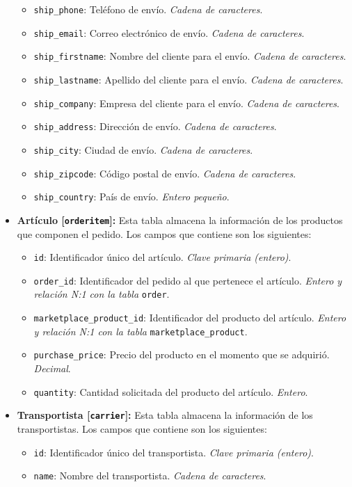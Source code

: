 \begin{itemize}
\begin{itemize}
              \item \texttt{ship\_phone}: Teléfono de envío. \textit{Cadena de caracteres}.
              \item \texttt{ship\_email}: Correo electrónico de envío. \textit{Cadena de caracteres}.
              \item \texttt{ship\_firstname}: Nombre del cliente para el envío. \textit{Cadena de caracteres}.
              \item \texttt{ship\_lastname}: Apellido del cliente para el envío. \textit{Cadena de caracteres}.
              \item \texttt{ship\_company}: Empresa del cliente para el envío. \textit{Cadena de caracteres}.
              \item \texttt{ship\_address}: Dirección de envío. \textit{Cadena de caracteres}.
              \item \texttt{ship\_city}: Ciudad de envío. \textit{Cadena de caracteres}.
              \item \texttt{ship\_zipcode}: Código postal de envío. \textit{Cadena de caracteres}.
              \item \texttt{ship\_country}: País de envío. \textit{Entero pequeño}.
          \end{itemize}
    \item \textbf{Artículo [\texttt{orderitem}]:} Esta tabla almacena la información de los productos que componen el pedido. Los campos que contiene son los siguientes:
          \begin{itemize}
              \item \texttt{id}: Identificador único del artículo. \textit{Clave primaria (entero)}.
              \item \texttt{order\_id}: Identificador del pedido al que pertenece el artículo. \textit{Entero y relación N:1 con la tabla} \texttt{order}.
              \item \texttt{marketplace\_product\_id}: Identificador del producto del artículo. \textit{Entero y relación N:1 con la tabla} \texttt{marketplace\_product}.
              \item \texttt{purchase\_price}: Precio del producto en el momento que se adquirió. \textit{Decimal}.
              \item \texttt{quantity}: Cantidad solicitada del producto del artículo. \textit{Entero}.
          \end{itemize}
    \item \textbf{Transportista [\texttt{carrier}]:} Esta tabla almacena la información de los transportistas. Los campos que contiene son los siguientes:
          \begin{itemize}
              \item \texttt{id}: Identificador único del transportista. \textit{Clave primaria (entero)}.
              \item \texttt{name}: Nombre del transportista. \textit{Cadena de caracteres}.
          \end{itemize}
\end{itemize}

